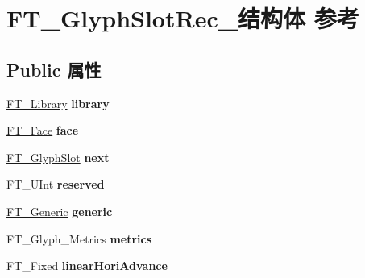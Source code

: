 \hypertarget{struct_f_t___glyph_slot_rec__}{}\section{F\+T\+\_\+\+Glyph\+Slot\+Rec\+\_\+结构体 参考}
\label{struct_f_t___glyph_slot_rec__}
\subsection*{Public 属性}
\begin{DoxyCompactItemize}
\item 
\mbox{\label{struct_f_t___glyph_slot_rec___a5415bcbf70efb3aae7a6b77040e21e91}} 
\hyperlink{struct_f_t___library_rec__}{F\+T\+\_\+\+Library} {\bfseries library}
\item 
\mbox{\label{struct_f_t___glyph_slot_rec___a0f5dbaf7d539bf2d92ecdff740342b04}} 
\hyperlink{struct_f_t___face_rec__}{F\+T\+\_\+\+Face} {\bfseries face}
\item 
\mbox{\label{struct_f_t___glyph_slot_rec___af339309df5ebe70dfa62a9f4f8838440}} 
\hyperlink{struct_f_t___glyph_slot_rec__}{F\+T\+\_\+\+Glyph\+Slot} {\bfseries next}
\item 
\mbox{\label{struct_f_t___glyph_slot_rec___ae829996584939557dfe46c4e4f2b28a8}} 
F\+T\+\_\+\+U\+Int {\bfseries reserved}
\item 
\mbox{\label{struct_f_t___glyph_slot_rec___ac2d04848997fba660e17bc00760ef14f}} 
\hyperlink{struct_f_t___generic__}{F\+T\+\_\+\+Generic} {\bfseries generic}
\item 
\mbox{\label{struct_f_t___glyph_slot_rec___abe1ba307281c06a232f50e34c061ce7b}} 
F\+T\+\_\+\+Glyph\+\_\+\+Metrics {\bfseries metrics}
\item 
\mbox{\label{struct_f_t___glyph_slot_rec___a9d0ba6b09729d4f009ef380e267607c3}} 
F\+T\+\_\+\+Fixed {\bfseries linear\+Hori\+Advance}
\item 
\mbox{\label{struct_f_t___glyph_slot_rec___abc10f58c3d859e46694515956aa4a1e8}} 

\end{DoxyCompactItemize}
